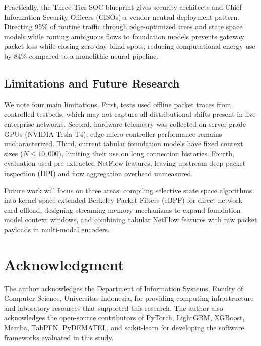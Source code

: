 \documentclass[10pt,a4paper]{article}
\begin{document}
Practically, the Three-Tier SOC blueprint gives security architects and Chief Information Security Officers (CISOs) a vendor-neutral deployment pattern. Directing 95\% of routine traffic through edge-optimized trees and state space models while routing ambiguous flows to foundation models prevents gateway packet loss while closing zero-day blind spots, reducing computational energy use by 84\% compared to a monolithic neural pipeline.

\subsection*{Limitations and Future Research}
We note four main limitations. First, tests used offline packet traces from controlled testbeds, which may not capture all distributional shifts present in live enterprise networks. Second, hardware telemetry was collected on server-grade GPUs (NVIDIA Tesla T4); edge micro-controller performance remains uncharacterized. Third, current tabular foundation models have fixed context sizes ($N \le 10,000$), limiting their use on long connection histories. Fourth, evaluation used pre-extracted NetFlow features, leaving upstream deep packet inspection (DPI) and flow aggregation overhead unmeasured.

Future work will focus on three areas: compiling selective state space algorithms into kernel-space extended Berkeley Packet Filters (eBPF) for direct network card offload, designing streaming memory mechanisms to expand foundation model context windows, and combining tabular NetFlow features with raw packet payloads in multi-modal encoders.

\section*{Acknowledgment}
The author acknowledges the Department of Information Systems, Faculty of Computer Science, Universitas Indonesia, for providing computing infrastructure and laboratory resources that supported this research. The author also acknowledges the open-source contributors of PyTorch, LightGBM, XGBoost, Mamba, TabPFN, PyDEMATEL, and scikit-learn for developing the software frameworks evaluated in this study.



\end{document}
